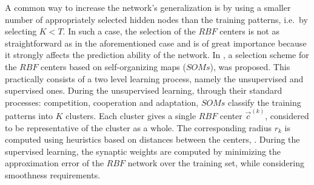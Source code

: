 A common way to increase the network's generalization \cite{Pog1990, Tik76, Tik95} is by using a smaller number of appropriately selected hidden nodes than the training patterns, i.e.\ by selecting $K\!<\!T$. 
In such a case, the selection of the $RBF$ centers is not as straightforward as in the aforementioned case and is of great importance because 
it strongly affects the prediction ability of the network. 
In \cite{LTT_2_029}, a selection scheme for the $RBF$ centers based on 
self-organizing maps ($SOMs$), \cite{Fri94a, Hayk1999} was proposed. 
This practically consists of a two level learning process, namely the unsupervised and  supervised ones.
During the unsupervised learning, through their standard processes: 
competition, cooperation and adaptation, $SOMs$  classify the training 
patterns into $K$ clusters.  
Each cluster gives a single $RBF$ center $\vec{c}^{(k)}$, considered to be representative of the cluster as a whole. The corresponding radius $r_k$ is computed using heuristics based on distances between the centers, \cite{Karay1997, LTT_2_029, Hayk1999, BenArc02}.
During the supervised learning, the synaptic weights are computed by minimizing the approximation error of the $RBF$ network over the training set, while considering smoothness requirements.
%


